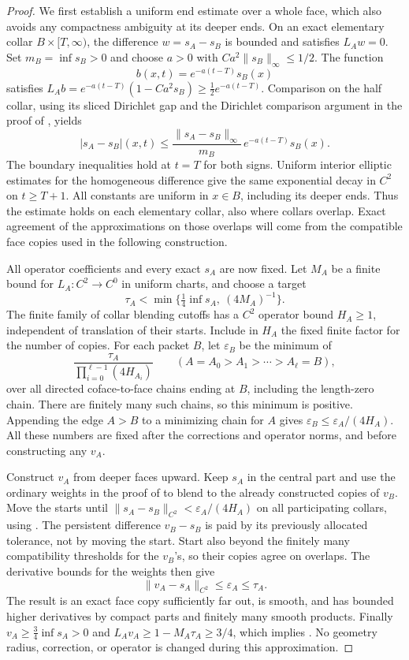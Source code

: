 \begin{proof}
We first establish a uniform end estimate over a whole face, which
also avoids any compactness ambiguity at its deeper ends.  On an
exact elementary collar $B\times[T,\infty)$, the difference
$w=s_A-s_B$ is bounded and satisfies $L_Aw=0$.  Set
$m_B=\inf s_B>0$ and choose $a>0$ with
$Ca^2\|s_B\|_\infty\le1/2$.  The function
\[
 b(x,t)=e^{-a(t-T)}s_B(x)
\]
satisfies $L_Ab=e^{-a(t-T)}(1-Ca^2s_B)\ge\tfrac12e^{-a(t-T)}$.
Comparison on the half collar, using its sliced Dirichlet gap and
the Dirichlet comparison argument in the proof of
, yields
\begin{equation}\label{regular:end-decay}
 |s_A-s_B|(x,t)\le
 \frac{\|s_A-s_B\|_\infty}{m_B}\,
 e^{-a(t-T)}s_B(x).
\end{equation}
The boundary inequalities hold at $t=T$ for both signs.  Uniform
interior elliptic estimates for the homogeneous difference give the
same exponential decay in $C^2$ on $t\ge T+1$.  All constants are
uniform in $x\in B$, including its deeper ends.  Thus the estimate holds
on each elementary collar, also where collars overlap.  Exact agreement
of the approximations on those overlaps will come from the compatible
face copies used in the following construction.

All operator coefficients and every exact $s_A$ are now fixed.  Let
$M_A$ be a finite bound for $L_A:C^2\to C^0$ in uniform charts, and
choose a target
\[
 \tau_A<\min\{\tfrac14\inf s_A,\ (4M_A)^{-1}\}.
\]
The finite family of collar blending cutoffs has a $C^2$ operator
bound $H_A\ge1$, independent of translation of their starts.  Include in $H_A$ the fixed finite factor for the number of copies.
For each packet $B$, let $\varepsilon_B$ be the minimum of
\[
 \frac{\tau_A}{\prod_{i=0}^{\ell-1}(4H_{A_i})}
 \qquad
 (A=A_0>A_1>\cdots>A_\ell=B),
\]
over all directed coface-to-face chains ending at $B$, including the
length-zero chain. There are finitely many such chains, so this
minimum is positive. Appending the edge $A>B$ to a minimizing chain
for $A$ gives $\varepsilon_B\le\varepsilon_A/(4H_A)$.
All these numbers are fixed after the corrections and operator norms,
and before constructing any $v_A$.

Construct $v_A$ from deeper faces upward.  Keep $s_A$ in the central
part and use the ordinary weights in the proof of
 to blend to the already constructed copies
of $v_B$.  Move the starts until
$\|s_A-s_B\|_{C^2}<\varepsilon_A/(4H_A)$ on all participating
collars, using .  The persistent difference
$v_B-s_B$ is paid by its previously allocated tolerance, not by moving
the start.  Start also beyond the finitely many compatibility
thresholds for the $v_B$'s, so their copies agree on overlaps.
The derivative bounds for the weights then give
\[
 \|v_A-s_A\|_{C^2}\le\varepsilon_A\le\tau_A.
\]
The result is an exact face copy sufficiently far out, is smooth,
and has bounded higher derivatives by compact parts and finitely
many smooth products.  Finally $v_A\ge\tfrac34\inf s_A>0$ and
$L_Av_A\ge1-M_A\tau_A\ge3/4$, which implies
.  No geometry radius, correction,
or operator is changed during this approximation.
\end{proof}

